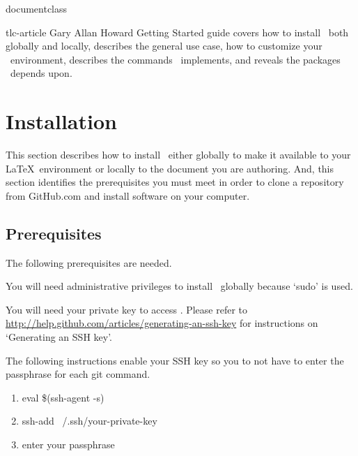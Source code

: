 documentclass\documentclass[12pt]{tlc-article}
\begin{document}

\tlcTitlePageAndTableOfContents
  {tlc-article}
  {Gary Allan Howard}
  {Getting Started guide covers how to install \tlcA\ both globally and
    locally, describes the general use case, how to customize your \tlcA\
    environment, describes the commands \tlcA\ implements, and reveals the
    packages \tlcA\ depends upon.}


\section{Installation}
This section describes how to install \tlcA\ either globally to make it
available to your \LaTeX\ environment or locally to the document you are
authoring.  And, this section identifies the prerequisites you must meet in
order to clone a repository from GitHub.com and install software on your
computer.

\subsection{Prerequisites}
The following prerequisites are needed.
\begin{description}[style=nextline]
  \item[Administrative privilege] You will need administrative privileges to
    install \tlcA\ globally because `sudo' is used.

  \item[SSH key] You will need your private key to access \gitHub.  Please refer
    to \url{http://help.github.com/articles/generating-an-ssh-key} for
    instructions on `Generating an SSH key'.

  \item[Enable your SSH key] The following instructions enable your SSH key so
    you to not have to enter the passphrase for each git command.

    \begin{enumerate}
      \item eval \$(ssh-agent -s)
      \item ssh-add ~/.ssh/your-private-key
      \item enter your passphrase
    \end{enumerate}

\end{description}
\end{document}
